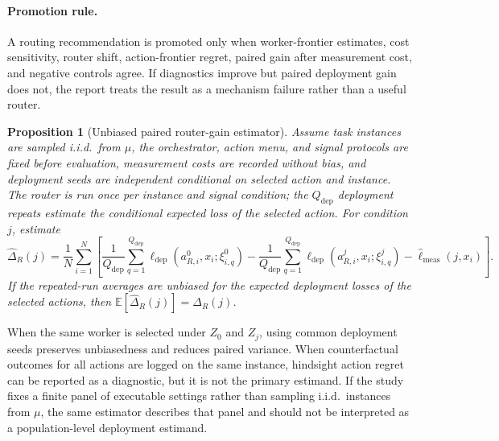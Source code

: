 \documentclass{article}
\newtheorem{proposition}{Proposition}
\newcommand{\E}{\mathbb{E}}
\begin{document}
\paragraph{Promotion rule.}
A routing recommendation is promoted only when worker-frontier estimates, cost sensitivity, router shift, action-frontier regret, paired gain after measurement cost, and negative controls agree.
If diagnostics improve but paired deployment gain does not, the report treats the result as a mechanism failure rather than a useful router.

\begin{proposition}[Unbiased paired router-gain estimator]
\label{prop:paired-unbiased}
Assume task instances are sampled i.i.d.\ from $\mu$, the orchestrator, action menu, and signal protocols are fixed before evaluation, measurement costs are recorded without bias, and deployment seeds are independent conditional on selected action and instance.
The router is run once per instance and signal condition; the $Q_{\mathrm{dep}}$ deployment repeats estimate the conditional expected loss of the selected action.
For condition $j$, estimate
\[
\widehat{\Delta}_R(j)
=
\frac{1}{N}\sum_{i=1}^N
\left[
\frac{1}{Q_{\mathrm{dep}}}\sum_{q=1}^{Q_{\mathrm{dep}}}
\ell_{\mathrm{dep}}(a_{R,i}^0,x_i;\xi_{i,q}^{0})
-
\frac{1}{Q_{\mathrm{dep}}}\sum_{q=1}^{Q_{\mathrm{dep}}}
\ell_{\mathrm{dep}}(a_{R,i}^j,x_i;\xi_{i,q}^{j})
-
\widehat{\ell}_{\mathrm{meas}}(j,x_i)
\right].
\]
If the repeated-run averages are unbiased for the expected deployment losses of the selected actions, then
$\E[\widehat{\Delta}_R(j)]=\Delta_R(j)$.
\end{proposition}

When the same worker is selected under $Z_0$ and $Z_j$, using common deployment seeds preserves unbiasedness and reduces paired variance.
When counterfactual outcomes for all actions are logged on the same instance, hindsight action regret can be reported as a diagnostic, but it is not the primary estimand.
If the study fixes a finite panel of executable settings rather than sampling i.i.d.\ instances from $\mu$, the same estimator describes that panel and should not be interpreted as a population-level deployment estimand.
\end{document}
